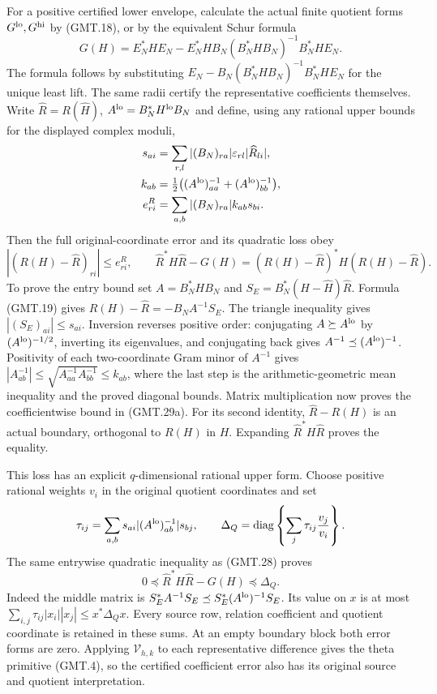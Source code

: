 For a positive certified lower envelope, calculate the actual finite
quotient forms $G^{\rm lo},G^{\rm hi}$ by (GMT.18), or by the
equivalent Schur formula
\[
 G(H)=E_N^*HE_N-E_N^*HB_N(B_N^*HB_N)^{-1}B_N^*HE_N.             \tag{GMT.29}
\]
The formula follows by substituting
$E_N-B_N(B_N^*HB_N)^{-1}B_N^*HE_N$ for the unique least lift.
The same radii certify the representative coefficients themselves.
Write $\widehat R=R(\widehat H)$,
$A^{\rm lo}=B_N^*H^{\rm lo}B_N$ and define, using any rational
upper bounds for the displayed complex moduli,
\[
 \begin{split}
 s_{ai}&=\sum_{r,l}|(B_N)_{ra}|\varepsilon_{rl}|\widehat R_{li}|,\\
 k_{ab}&=\tfrac12\bigl((A^{\rm lo})^{-1}_{aa}
                              +(A^{\rm lo})^{-1}_{bb}\bigr),\\
 e^R_{ri}&=\sum_{a,b}|(B_N)_{ra}|k_{ab}s_{bi}.
 \end{split}
\]
Then the full original-coordinate error and its quadratic loss obey
\[
 \boxed{|(R(H)-\widehat R)_{ri}|\le e^R_{ri},\qquad
 \widehat R^*H\widehat R-G(H)
 =(R(H)-\widehat R)^*H(R(H)-\widehat R).}                     \tag{GMT.29a}
\]
To prove the entry bound set $A=B_N^*HB_N$ and
$S_E=B_N^*(H-\widehat H)\widehat R$.
Formula (GMT.19) gives $R(H)-\widehat R=-B_NA^{-1}S_E$.
The triangle inequality gives $|(S_E)_{ai}|\le s_{ai}$.
Inversion reverses positive order: conjugating $A\succeq A^{\rm lo}$
by $(A^{\rm lo})^{-1/2}$, inverting its eigenvalues, and conjugating
back gives $A^{-1}\preceq(A^{\rm lo})^{-1}$.
Positivity of each two-coordinate Gram minor of $A^{-1}$ gives
$|A^{-1}_{ab}|\le\sqrt{A^{-1}_{aa}A^{-1}_{bb}}\le k_{ab}$,
where the last step is the arithmetic-geometric mean inequality and
the proved diagonal bounds. Matrix multiplication now proves the
coefficientwise bound in (GMT.29a). For its second identity,
$\widehat R-R(H)$ is an actual boundary, orthogonal to $R(H)$
in $H$. Expanding $\widehat R^*H\widehat R$ proves the equality.

This loss has an explicit $q$-dimensional rational upper form.
Choose positive rational weights $v_i$ in the original quotient
coordinates and set
\[
 \tau_{ij}=\sum_{a,b}s_{ai}|(A^{\rm lo})^{-1}_{ab}|s_{bj},\qquad
 \Delta_Q=\operatorname{diag}\left\{\sum_j\tau_{ij}\frac{v_j}{v_i}\right\}.
\]
The same entrywise quadratic inequality as (GMT.28) proves
\[
 \boxed{0\preceq\widehat R^*H\widehat R-G(H)\preceq\Delta_Q.}
                                                                    \tag{GMT.29b}
\]
Indeed the middle matrix is $S_E^*A^{-1}S_E\preceq
S_E^*(A^{\rm lo})^{-1}S_E$. Its value on $x$ is at most
$\sum_{i,j}\tau_{ij}|x_i||x_j|\le x^*\Delta_Qx$.
Every source row, relation coefficient and quotient coordinate is
retained in these sums. At an empty boundary block both error forms
are zero. Applying $\mathcal V_{h,k}$ to each representative difference
gives the theta primitive (GMT.4), so the certified coefficient
error also has its original source and quotient interpretation.

